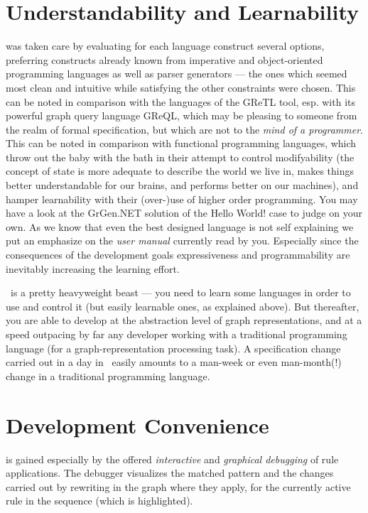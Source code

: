 \section{Understandability and Learnability}
was taken care by evaluating for each language construct several options,
preferring constructs already known from imperative and object-oriented programming languages as well as parser generators ---
the ones which seemed most clean and intuitive while satisfying the other constraints were chosen.
This can be noted in comparison with the languages of the GReTL \cite{GReTL} tool, esp. with its powerful graph query language GReQL,
which may be pleasing to someone from the realm of formal specification, but which are not to the \emph{mind of a programmer}.
This can be noted in comparison with functional programming languages, which throw out the baby with the bath in their attempt to control modifyability (the concept of state is more adequate to describe the world we live in, makes things better understandable for our brains, and performs better on our machines), and hamper learnability with their (over-)use of higher order programming.
You may have a look at the GrGen.NET solution of the Hello World! case \cite{HelloWorld} to judge on your own.
As we know that even the best designed language is not self explaining we put an emphasize on the \emph{user manual} currently read by you.
Especially since the consequences of the development goals expressiveness and programmability are inevitably increasing the learning effort.

\GrG\ is a pretty heavyweight beast --- you need to learn some languages in order to use and control it (but easily learnable ones, as explained above).
But thereafter, you are able to develop at the abstraction level of graph representations, and at a speed outpacing by far any developer working with a traditional programming language (for a graph-representation processing task).
A specification change carried out in a day in \GrG\ easily amounts to a man-week or even man-month(!) change in a traditional programming language.

\section{Development Convenience}
is gained especially by the offered \emph{interactive} and \emph{graphical debugging} of rule applications.
The debugger visualizes the matched pattern and the changes carried out by rewriting in the graph where they apply,
for the currently active rule in the sequence (which is highlighted).

